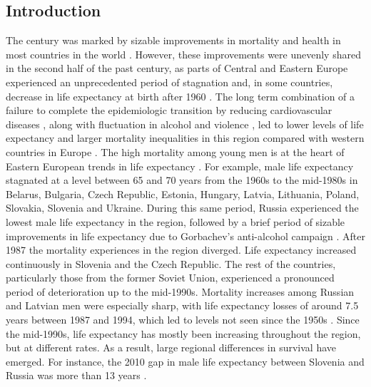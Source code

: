 \documentclass{article}
\begin{document}
\begin{spacing}{1.5}
\section*{Introduction}
The  century was marked by sizable improvements in mortality and health in most countries in the world \citep{who2000}. However, these improvements were unevenly shared in the second half of the past century, as parts of Central and Eastern Europe experienced an unprecedented period of stagnation and, in some countries, decrease in life expectancy at birth after 1960 \citep{HMD}. The long term combination of a failure to complete the epidemiologic transition by reducing cardiovascular diseases \citep{caselli2002epidemiologic}, along with fluctuation in alcohol and violence \citep{bye2008alcohol,leon1997huge}, led to lower levels of life expectancy and larger mortality inequalities in this region compared with western countries in Europe \citep{mackenbach2008socioeconomic}. The high mortality among young men is at the heart of Eastern European trends in life expectancy \citep{mckee2001}. For example, male life expectancy stagnated at a level between 65 and 70 years from the 1960s to the mid-1980s in Belarus, Bulgaria, Czech Republic, Estonia, Hungary, Latvia, Lithuania, Poland, Slovakia, Slovenia and Ukraine. During this same period, Russia experienced the lowest male life expectancy in the region, followed by a brief period of sizable improvements in life expectancy due to Gorbachev's anti-alcohol campaign \citep{leon1998social}. After 1987 the mortality experiences in the region diverged. Life expectancy increased continuously in Slovenia and the Czech Republic. The rest of the countries, particularly those from the former Soviet Union, experienced a pronounced period of deterioration up to the mid-1990s. Mortality increases among Russian and Latvian men were especially sharp, with life expectancy losses of around 7.5 years between 1987 and 1994, which led to levels not seen since the 1950s \citep{shkolnikov2001}. Since the mid-1990s, life expectancy has mostly been increasing throughout the region, but at different rates. As a result, large regional differences in survival have emerged. For instance, the 2010 gap in male life expectancy between Slovenia and Russia was more than 13 years \citep{HMD}.\\


\end{spacing}
\end{document}
